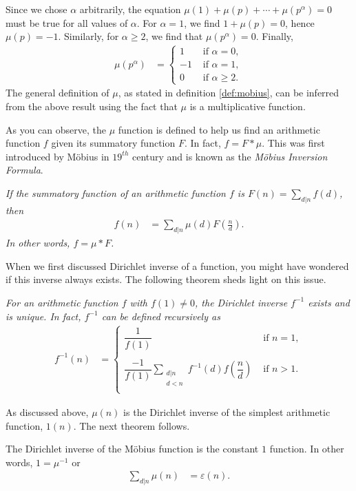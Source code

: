 \documentclass[12pt]{subfile}
\begin{document}
	Since we chose $\alpha$ arbitrarily, the equation $\mu(1) + \mu(p) + \cdots + \mu(p^\alpha)=0$ must be true for all values of $\alpha$. For $\alpha=1$, we find $1 + \mu(p) = 0$, hence $\mu(p)=-1$. Similarly, for $\alpha\geq 2$, we find that $\mu(p^\alpha)=0$. Finally,
		\begin{align*}
			\mu(p^\alpha) & = \begin{cases}
			1&\mbox{ if }\alpha=0,\\
			-1&\mbox{ if }\alpha=1,\\
			0&\mbox{ if }\alpha\geq 2.
			\end{cases}
		\end{align*}
	The general definition of $\mu$, as stated in definition \ref{def:mobius}, can be inferred from the above result using the fact that $\mu$ is a multiplicative function.

	As you can observe, the $\mu$ function is defined to help us find an arithmetic function $f$ given its summatory function $F$. In fact, $f=F \ast \mu$. This was first introduced by M\"{o}bius in $19^{th}$ century and is known as the \textit{M\"{o}bius Inversion Formula}.

		\begin{theorem}\slshape
			\label{thm:mobinv}
			If the summatory function of an arithmetic function $f$ is $\displaystyle F(n)=\sum\limits_{d|n}f(d)$, then
			\begin{align*}
			f(n) & =\sum_{d|n}\mu(d)F\left(\frac nd\right).
			\end{align*}
			In other words, $f=\mu\ast F$.
		\end{theorem}


	When we first discussed Dirichlet inverse of a function, you might have wondered if this inverse always exists. The following theorem sheds light on this issue.

		\begin{theorem}\slshape \label{thm:dirichletinverse}
			For an arithmetic function $f$ with $f(1)\neq0$, the Dirichlet inverse $f^{-1}$ exists and is unique. In fact, $f^{-1}$ can be defined recursively as
				\begin{align*}
				f^{-1}(n) & = \begin{cases}
				\dfrac1{f(1)}&\mbox{ if }n=1,\\ \\
				\displaystyle\dfrac{-1}{f(1)}\sum_{\substack{d|n\\d<n}}f^{-1}(d)f\left(\dfrac nd\right)&\mbox{ if }n>1.\\
				\end{cases}
		\end{align*}
		\end{theorem}
	As discussed above, $\mu(n)$ is the Dirichlet inverse of the simplest arithmetic function, $1(n)$. The next theorem follows.
		\begin{theorem}
			\label{thm:mobiusinverse}
			The Dirichlet inverse of the M\"{o}bius function is the constant $1$ function. In other words, $1=\mu^{-1}$ or
			\begin{align*}
			\sum_{d|n}\mu(n) & =\varepsilon(n).
			\end{align*}
		\end{theorem}
\end{document}
